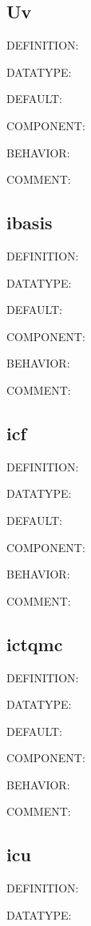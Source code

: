 \subsection{Uv}
{\color{red}DEFINITION:}

{\color{green}DATATYPE:}

{\color{blue}DEFAULT:}

{\color{brown}COMPONENT:}

{\color{purple}BEHAVIOR:}

{\color{olive}COMMENT:}

\subsection{ibasis}
{\color{red}DEFINITION:}

{\color{green}DATATYPE:}

{\color{blue}DEFAULT:}

{\color{brown}COMPONENT:}

{\color{purple}BEHAVIOR:}

{\color{olive}COMMENT:}

\subsection{icf}
{\color{red}DEFINITION:}

{\color{green}DATATYPE:}

{\color{blue}DEFAULT:}

{\color{brown}COMPONENT:}

{\color{purple}BEHAVIOR:}

{\color{olive}COMMENT:}

\subsection{ictqmc}
{\color{red}DEFINITION:}

{\color{green}DATATYPE:}

{\color{blue}DEFAULT:}

{\color{brown}COMPONENT:}

{\color{purple}BEHAVIOR:}

{\color{olive}COMMENT:}

\subsection{icu}
{\color{red}DEFINITION:}

{\color{green}DATATYPE:}

